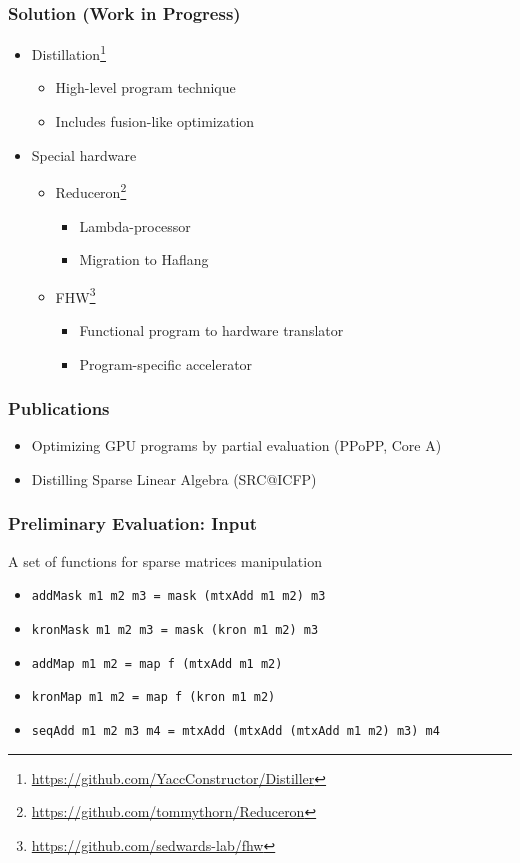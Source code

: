 \documentclass[xcolor=table,aspectratio=169]{beamer}
\begin{document}
\begin{frame}[fragile]
  \frametitle{Solution (Work in Progress)}  
  \begin{itemize}
  \item Distillation\footnote{\href{https://github.com/YaccConstructor/Distiller}{https://github.com/YaccConstructor/Distiller}} 
  \begin{itemize}
    \item High-level program technique
    \item Includes fusion-like optimization
  \end{itemize} 
  \item Special hardware
  \begin{itemize}
    \item Reduceron\footnote{\href{https://github.com/tommythorn/Reduceron}{https://github.com/tommythorn/Reduceron}}
    \begin{itemize}
      \item Lambda-processor
      \item Migration to Haflang
    \end{itemize}
    \item FHW\footnote{\href{https://github.com/sedwards-lab/fhw}{https://github.com/sedwards-lab/fhw}}
    \begin{itemize}
      \item Functional program to hardware translator
      \item Program-specific accelerator
    \end{itemize}
  \end{itemize}
  \end{itemize}
\end{frame}

\begin{frame}[fragile]
  \frametitle{Publications}
    \begin{itemize}
        \item Optimizing GPU programs by partial evaluation (PPoPP, Core A)
        \item Distilling Sparse Linear Algebra (SRC@ICFP)
    \end{itemize}
\end{frame}

\begin{frame}[fragile]
  \frametitle{Preliminary Evaluation: Input}
  A set of functions for sparse matrices manipulation  
    \begin{itemize}
      \item \verb|addMask m1 m2 m3 = mask (mtxAdd m1 m2) m3|
      \item \verb|kronMask m1 m2 m3 = mask (kron m1 m2) m3 |   
      \item \verb|addMap m1 m2 = map f (mtxAdd m1 m2)|
      \item \verb|kronMap m1 m2 = map f (kron m1 m2)|
      \item \verb|seqAdd m1 m2 m3 m4 = mtxAdd (mtxAdd (mtxAdd m1 m2) m3) m4|              
    \end{itemize}
\end{frame}
\end{document}
